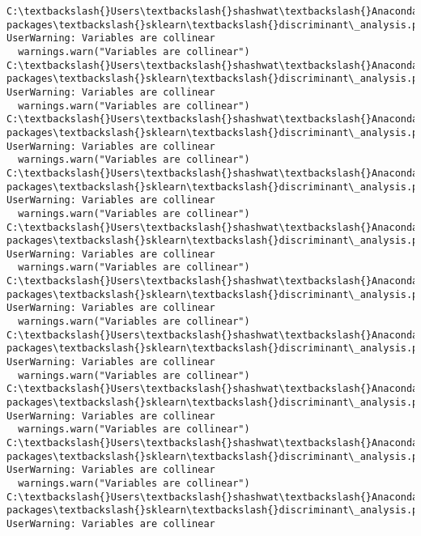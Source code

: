 \documentclass[11pt]{article}
\begin{document}
    \begin{Verbatim}[commandchars=\\\{\}]
C:\textbackslash{}Users\textbackslash{}shashwat\textbackslash{}Anaconda3\textbackslash{}lib\textbackslash{}site-packages\textbackslash{}sklearn\textbackslash{}discriminant\_analysis.py:682: UserWarning: Variables are collinear
  warnings.warn("Variables are collinear")
C:\textbackslash{}Users\textbackslash{}shashwat\textbackslash{}Anaconda3\textbackslash{}lib\textbackslash{}site-packages\textbackslash{}sklearn\textbackslash{}discriminant\_analysis.py:682: UserWarning: Variables are collinear
  warnings.warn("Variables are collinear")
C:\textbackslash{}Users\textbackslash{}shashwat\textbackslash{}Anaconda3\textbackslash{}lib\textbackslash{}site-packages\textbackslash{}sklearn\textbackslash{}discriminant\_analysis.py:682: UserWarning: Variables are collinear
  warnings.warn("Variables are collinear")
C:\textbackslash{}Users\textbackslash{}shashwat\textbackslash{}Anaconda3\textbackslash{}lib\textbackslash{}site-packages\textbackslash{}sklearn\textbackslash{}discriminant\_analysis.py:682: UserWarning: Variables are collinear
  warnings.warn("Variables are collinear")
C:\textbackslash{}Users\textbackslash{}shashwat\textbackslash{}Anaconda3\textbackslash{}lib\textbackslash{}site-packages\textbackslash{}sklearn\textbackslash{}discriminant\_analysis.py:682: UserWarning: Variables are collinear
  warnings.warn("Variables are collinear")
C:\textbackslash{}Users\textbackslash{}shashwat\textbackslash{}Anaconda3\textbackslash{}lib\textbackslash{}site-packages\textbackslash{}sklearn\textbackslash{}discriminant\_analysis.py:682: UserWarning: Variables are collinear
  warnings.warn("Variables are collinear")
C:\textbackslash{}Users\textbackslash{}shashwat\textbackslash{}Anaconda3\textbackslash{}lib\textbackslash{}site-packages\textbackslash{}sklearn\textbackslash{}discriminant\_analysis.py:682: UserWarning: Variables are collinear
  warnings.warn("Variables are collinear")
C:\textbackslash{}Users\textbackslash{}shashwat\textbackslash{}Anaconda3\textbackslash{}lib\textbackslash{}site-packages\textbackslash{}sklearn\textbackslash{}discriminant\_analysis.py:682: UserWarning: Variables are collinear
  warnings.warn("Variables are collinear")
C:\textbackslash{}Users\textbackslash{}shashwat\textbackslash{}Anaconda3\textbackslash{}lib\textbackslash{}site-packages\textbackslash{}sklearn\textbackslash{}discriminant\_analysis.py:682: UserWarning: Variables are collinear
  warnings.warn("Variables are collinear")
C:\textbackslash{}Users\textbackslash{}shashwat\textbackslash{}Anaconda3\textbackslash{}lib\textbackslash{}site-packages\textbackslash{}sklearn\textbackslash{}discriminant\_analysis.py:682: UserWarning: Variables are collinear

\end{Verbatim}
\end{document}
